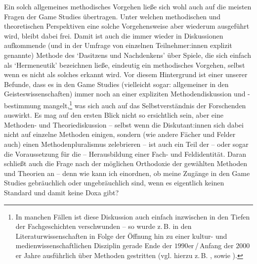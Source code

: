 \documentclass{scrartcl}
\begin{document}
Ein solch allgemeines methodisches Vorgehen ließe sich wohl auch auf die meisten Fragen der Game Studies übertragen.
Unter welchen methodischen und theoretischen Perspektiven eine solche Vorgehensweise aber wiederum ausgeführt wird, bleibt dabei frei.
Damit ist auch die immer wieder in Diskussionen aufkommende (und in der Umfrage von einzelnen Teilnehmer:innen explizit genannte) Methode des \enquote*{Dasitzens und Nachdenkens} über Spiele, die sich einfach als \enquote*{Hermeneutik} bezeichnen ließe, eindeutig ein methodisches Vorgehen, selbst wenn es nicht als solches erkannt wird.
Vor diesem Hintergrund ist einer unserer Befunde, dass es in den Game Studies (vielleicht sogar: allgemeiner in den Geisteswissenschaften) immer noch an einer expliziten Methodendiskussion und -bestimmung mangelt,\footnote{In manchen Fällen ist diese Diskussion auch einfach inzwischen in den Tiefen der Fachgeschichten verschwunden -- so wurde z.\,B. in den Literaturwissenschaften in Folge der Öffnung hin zu einer kultur- und medienwissenschaftlichen Disziplin gerade Ende der $1990$er\,/\,Anfang der $2000$er Jahre ausführlich über Methoden gestritten (vgl. hierzu z.\,B. \autocite[][S.~33--34]{dainat_literatur_2007}, sowie \autocite[][S.~11--12]{jahraus_literaturtheorie_2004}).} was sich auch auf das Selbstverständnis der Forschenden auswirkt.
Es mag auf den ersten Blick nicht so ersichtlich sein, aber eine Methoden- und Theoriediskussion -- selbst wenn die Diskutant:innen sich dabei nicht auf einzelne Methoden einigen, sondern (wie andere Fächer und Felder auch) einen Methodenpluralismus zelebrieren -- ist auch ein Teil der -- oder sogar die Voraussetzung für die -- Herausbildung einer Fach- und Feldidentität.
Daran schließt auch die Frage nach der möglichen Orthodoxie der gewählten Methoden und Theorien an -- denn wie kann ich einordnen, ob meine Zugänge in den Game Studies gebräuchlich oder ungebräuchlich sind, wenn es eigentlich keinen Standard und damit keine Doxa gibt?
\end{document}
